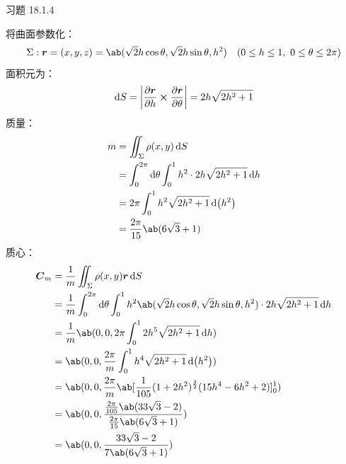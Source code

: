 \begin{problem}
	习题 18.1.4
	\begin{solution}
		将曲面参数化：
		$$
		\Sigma: \vect{r} = (x, y, z) = \ab(\sqrt{2} h \cos \theta, \sqrt{2} h \sin \theta, h^2) \quad (0 \le h \le 1,\ 0 \le \theta \le 2\pi)
		$$
		面积元为：
		$$
		\dd{S} = \abs{\pdv{\vect{r}}{h} \cp \pdv{\vect{r}}{\theta}} = 2h \sqrt{2h^2 + 1}
		$$
		质量：
		$$
		\begin{aligned}
			m & = \iint_{\Sigma} \rho(x, y) \dd{S} \\
			& = \int_{0}^{2\pi} \dd{\theta} \int_{0}^{1} h^2 \cdot 2h \sqrt{2h^2 + 1} \dd{h} \\
			& = 2\pi \int_{0}^{1} h^2 \sqrt{2h^2 + 1} \dd(h^2) \\
			& = \frac{2\pi}{15} \ab(6 \sqrt{3} + 1)
		\end{aligned}
		$$
		质心：
		$$
		\begin{aligned}
			\vect{C}_m & = \frac{1}{m} \iint_{\Sigma} \rho(x, y) \vect{r} \dd{S} \\
			& = \frac{1}{m} \int_{0}^{2\pi} \dd{\theta} \int_{0}^{1} h^2 \ab(\sqrt{2} h \cos \theta, \sqrt{2} h \sin \theta, h^2) \cdot 2h \sqrt{2h^2 + 1} \dd{h} \\
			& = \frac{1}{m} \ab(0, 0, 2 \pi \int_{0}^{1} 2h^{5} \sqrt{2h^2 + 1} \dd{h}) \\
			& = \ab(0, 0, \frac{2\pi}{m} \int_{0}^{1} h^{4} \sqrt{2h^2 + 1} \dd(h^2)) \\
			& = \ab(0, 0, \frac{2\pi}{m} \ab[\frac{1}{105} (1 + 2h^2)^{\frac{3}{2}} (15 h^{4} - 6h^2 + 2)]_{0}^{1}) \\
			& = \ab(0, 0, \frac{\frac{2\pi}{105} \ab(33 \sqrt{3} - 2)}{\frac{2\pi}{15} \ab(6 \sqrt{3} + 1)}) \\
			& = \ab(0, 0, \frac{33 \sqrt{3} - 2}{7 \ab(6 \sqrt{3} + 1)})
		\end{aligned}
		$$
	\end{solution}
\end{problem}
